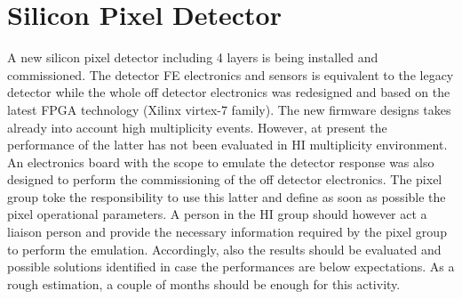 \section{Silicon Pixel Detector\label{sec:SiPixel}}
A new silicon pixel detector including 4 layers is being installed and commissioned. The detector FE electronics and
sensors is equivalent to the legacy detector while the whole off detector electronics was redesigned and based on the
latest FPGA technology (Xilinx virtex-7 family). The new firmware designs takes already into account high multiplicity
events. However, at present the performance of the latter has not been evaluated in HI multiplicity environment. An
electronics board with the scope to emulate the detector response was also designed to perform the commissioning of the
off detector electronics. The pixel group toke the responsibility to use this latter and define as soon as possible the
pixel operational parameters. A person in the HI group should however act a liaison person and provide the necessary
information required by the pixel group to perform the emulation. Accordingly, also the results should be evaluated and
possible solutions identified in case the performances are below expectations. As a rough estimation, a couple of months
should be enough for this activity.


